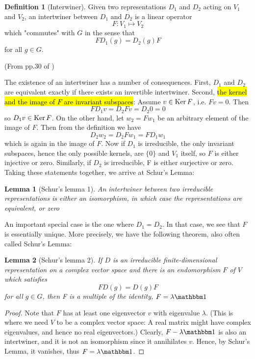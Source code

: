 \documentclass{article}
\numberwithin{equation}{subsection} %
\newtheorem{lemma}{Lemma}[section]
\theoremstyle{definition}
\newtheorem{defi}{Definition}[section]
\begin{document}
\begin{defi}[Interwiner]
    Given two representations $D_1$ and $D_2$ acting on $V_1$ and
    $V_2$, an intertwiner between $D_1$ and $D_2$ is a linear operator
    \begin{equation}
        F: V_1 \mapsto V_2
    \end{equation}
    which "commutes" with $G$ in the sense that
    \begin{equation}
        F D_1(g) = D_2(g) F
    \end{equation}
    for all $g\in G$.
\end{defi}

(From pp.30 of \cite{Ludeling})

The existence of an intertwiner has a number of consequences. First,
$D_1$ and $D_2$ are equivalent exactly if there exists an invertible
intertwiner. Second, \hl{the kernel and the image of $F$ are invariant
subspaces}: Assume $v\in \operatorname{Ker}{F}$, i.e. $Fv = 0$. Then
\begin{equation}
    FD_1 v = D_2 F v = D_2 0 = 0
\end{equation}
so $D_1 v\in \operatorname{Ker}{F}$. On the other hand, let $w_2 = Fw_1$ be an
arbitrary element of the image of $F$. Then from the definition we have
\begin{equation}
    D_2 w_2 = D_2 F w_1 = FD_1 w_1
\end{equation}
which is again in the image of $F$. Now if $D_1$ is irreducible, the only invariant subspaces,
hence the only possible kernels, are $\{0\}$ and $V_1$ itself, so $F$ is either injective or zero.
Similarly, if $D_2$ is irreducible, F is either surjective or zero. Taking these statements together, we arrive at Schur’s Lemma: 

\begin{lemma}[Schur's lemma 1]
    An intertwiner between two irreducible representations is either
    an isomorphism, in which case the representations are equivalent,
    or zero
\end{lemma}

An important special case is the one where $D_1 = D_2$. In that case,
we see that $F$ is essentially unique. More precisely, we have the
following theorem, also often called Schur’s Lemma:
\begin{lemma}[Schur's lemma 2]
    If $D$ is an irreducible finite-dimensional representation on a complex
vector space and there is an endomorphism $F$ of $V$ which satisfies 
\begin{equation}
    FD(g) = D(g) F
\end{equation}
for all $g\in G$, then F is a multiple of the identity, $F = \lambda
\id$
\end{lemma}
\begin{proof}
    Note that $F$ has at least one eigenvector $v$ with eigenvalue
    $\lambda$. (This is where we need $V$ to be a complex vector
    space: A real matrix might have complex eigenvalues, and hence no
    real eigenvectors.) Clearly, $F-\lambda\id$ is also an
    intertwiner, and it is not an isomorphism since it annihilates
    $v$. Hence, by Schur’s Lemma, it vanishes, thus $F = \lambda\id$.
\end{proof}
\end{document}
